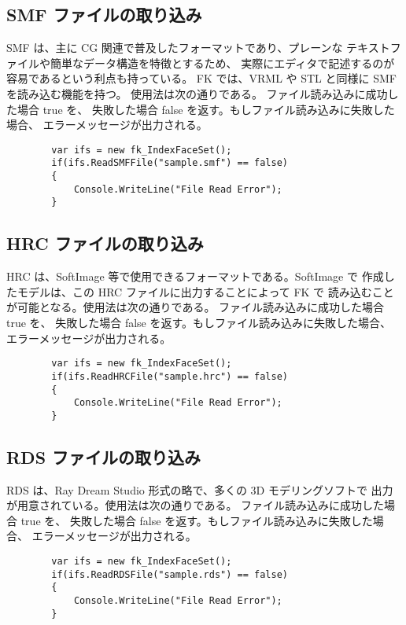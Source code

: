 \subsection{SMF ファイルの取り込み}
SMF は、主に CG 関連で普及したフォーマットであり、プレーンな
テキストファイルや簡単なデータ構造を特徴とするため、
実際にエディタで記述するのが容易であるという利点も持っている。
FK では、VRML や STL と同様に SMF を読み込む機能を持つ。
使用法は次の通りである。
ファイル読み込みに成功した場合 true を、
失敗した場合 false を返す。もしファイル読み込みに失敗した場合、
エラーメッセージが出力される。
\\
\begin{screen}
\begin{verbatim}
        var ifs = new fk_IndexFaceSet();
        if(ifs.ReadSMFFile("sample.smf") == false)
        {
            Console.WriteLine("File Read Error");
        }
\end{verbatim}
\end{screen}

\subsection{HRC ファイルの取り込み}
HRC は、SoftImage 等で使用できるフォーマットである。SoftImage で
作成したモデルは、この HRC ファイルに出力することによって FK で
読み込むことが可能となる。使用法は次の通りである。
ファイル読み込みに成功した場合 true を、
失敗した場合 false を返す。もしファイル読み込みに失敗した場合、
エラーメッセージが出力される。
\\
\begin{screen}
\begin{verbatim}
        var ifs = new fk_IndexFaceSet();
        if(ifs.ReadHRCFile("sample.hrc") == false)
        {
            Console.WriteLine("File Read Error");
        }
\end{verbatim}
\end{screen}

\subsection{RDS ファイルの取り込み}
RDS は、Ray Dream Studio 形式の略で、多くの 3D モデリングソフトで
出力が用意されている。使用法は次の通りである。
ファイル読み込みに成功した場合 true を、
失敗した場合 false を返す。もしファイル読み込みに失敗した場合、
エラーメッセージが出力される。
\\
\begin{screen}
\begin{verbatim}
        var ifs = new fk_IndexFaceSet();
        if(ifs.ReadRDSFile("sample.rds") == false)
        {
            Console.WriteLine("File Read Error");
        }
\end{verbatim}
\end{screen}

